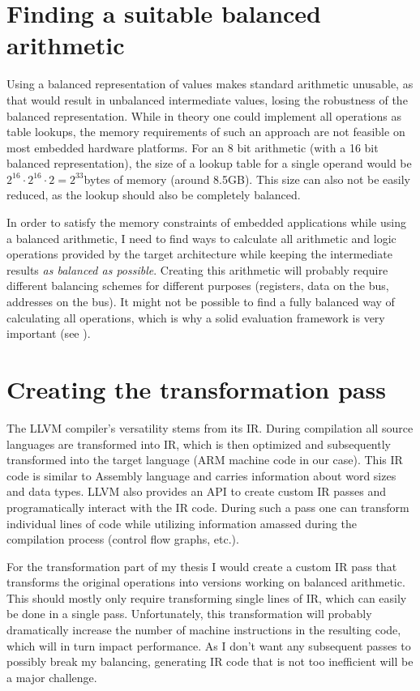 \documentclass{article}
\begin{document}
\section{Finding a suitable balanced arithmetic}
Using a balanced representation of values makes standard arithmetic unusable, as that would result in unbalanced intermediate values, losing the robustness of the balanced representation.
While in theory one could implement all operations as table lookups, the memory requirements of such an approach are not feasible on most embedded hardware platforms.
For an 8 bit arithmetic (with a 16 bit balanced representation), the size of a lookup table for a single operand would be $2^{16} \cdot 2^{16} \cdot 2 = 2^{33}$bytes of memory (around 8.5GB).
This size can also not be easily reduced, as the lookup should also be completely balanced.

In order to satisfy the memory constraints of embedded applications while using a balanced arithmetic, I need to find ways to calculate all arithmetic and logic operations provided by the target architecture while keeping the intermediate results \emph{as balanced as possible}.
Creating this arithmetic will probably require different balancing schemes for different purposes (registers, data on the bus, addresses on the bus).
It might not be possible to find a fully balanced way of calculating all operations, which is why a solid evaluation framework is very important (see ).

\section{Creating the transformation pass}
The LLVM compiler's versatility stems from its IR.
During compilation all source languages are transformed into IR, which is then optimized and subsequently transformed into the target language (ARM machine code in our case).
This IR code is similar to Assembly language and carries information about word sizes and data types.
LLVM also provides an API to create custom IR passes and programatically interact with the IR code.
During such a pass one can transform individual lines of code while utilizing information amassed during the compilation process (control flow graphs, etc.).

For the transformation part of my thesis I would create a custom IR pass that transforms the original operations into versions working on balanced arithmetic.
This should mostly only require transforming single lines of IR, which can easily be done in a single pass.
Unfortunately, this transformation will probably dramatically increase the number of machine instructions in the resulting code, which will in turn impact performance.
As I don't want any subsequent passes to possibly break my balancing, generating IR code that is not too inefficient will be a major challenge.
\end{document}

